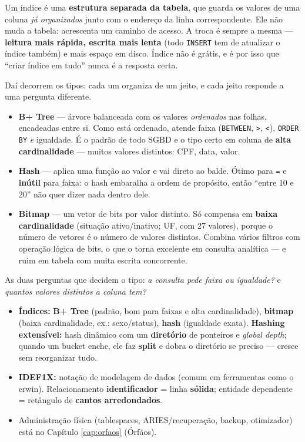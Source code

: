\begin{conceito}
Um índice é uma \textbf{estrutura separada da tabela}, que guarda os valores
de uma coluna \emph{já organizados} junto com o endereço da linha
correspondente. Ele não muda a tabela: acrescenta um caminho de acesso. A
troca é sempre a mesma --- \textbf{leitura mais rápida, escrita mais lenta}
(todo \texttt{INSERT} tem de atualizar o índice também) e mais espaço em
disco. Índice não é grátis, e é por isso que ``criar índice em tudo'' nunca é
a resposta certa.

Daí decorrem os tipos: cada um organiza de um jeito, e cada jeito responde a
uma pergunta diferente.

\begin{itemize}
\item \textbf{B+ Tree} --- árvore balanceada com os valores \emph{ordenados}
nas folhas, encadeadas entre si. Como está ordenado, atende faixa
(\texttt{BETWEEN}, \texttt{>}, \texttt{<}), \texttt{ORDER BY} \emph{e}
igualdade. É o padrão de todo SGBD e o tipo certo em coluna de \textbf{alta
cardinalidade} --- muitos valores distintos: CPF, data, valor.
\item \textbf{Hash} --- aplica uma função ao valor e vai direto ao balde.
Ótimo para \texttt{=} e \textbf{inútil} para faixa: o hash embaralha a ordem
de propósito, então ``entre 10 e 20'' não quer dizer nada dentro dele.
\item \textbf{Bitmap} --- um vetor de bits por valor distinto. Só compensa em
\textbf{baixa cardinalidade} (situação ativo/inativo; UF, com 27 valores),
porque o número de vetores é o número de valores distintos. Combina vários
filtros com operação lógica de bits, o que o torna excelente em consulta
analítica --- e ruim em tabela com muita escrita concorrente.
\end{itemize}

As duas perguntas que decidem o tipo: \emph{a consulta pede faixa ou
igualdade?} e \emph{quantos valores distintos a coluna tem?}
\end{conceito}

\begin{itemize}
\item \textbf{Índices:} \textbf{B+ Tree} (padrão, bom para faixas e alta
cardinalidade), \textbf{bitmap} (baixa cardinalidade, ex.: sexo/status),
\textbf{hash} (igualdade exata). \textbf{Hashing extensível:} hash dinâmico
com um \textbf{diretório} de ponteiros e \textit{global depth}; quando um
bucket enche, ele faz \textbf{split} e dobra o diretório se preciso --- cresce
sem reorganizar tudo.
\item \textbf{IDEF1X:} notação de modelagem de dados (comum em ferramentas
como o erwin). Relacionamento \textbf{identificador} = linha \textbf{sólida};
entidade dependente = retângulo de \textbf{cantos arredondados}.
\item Administração física (tablespaces, ARIES/recuperação, backup,
otimizador) está no Capítulo \ref{cap:orfaos} (Órfãos).
\end{itemize}

